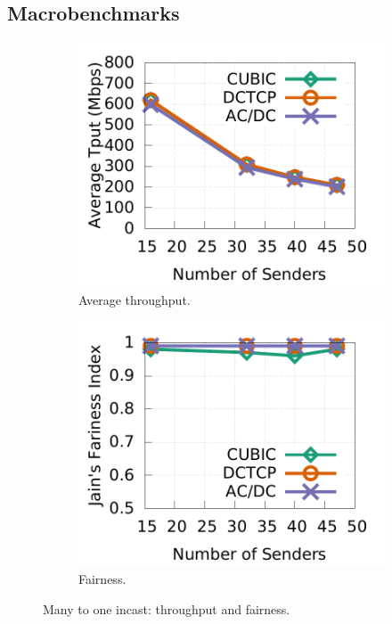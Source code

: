 \subsection{Macrobenchmarks}
\label{macro}

\begin{figure}[t]
        \centering
        \begin{subfigure}[b]{0.225\textwidth}
                \centering
                \includegraphics[width=\textwidth]{figures/incast/plots9k/incast_tput_vary_sender.pdf}
                \caption{Average throughput.}
                \label{incast_9k_tput}
        \end{subfigure}
        \begin{subfigure}[b]{0.225\textwidth}
                \centering
                \includegraphics[width=\textwidth]{figures/incast/plots9k/incast_fairness_vary_sender.pdf}
                \caption{Fairness.}
                \label{incast_9k_fariness}
        \end{subfigure}
        \caption{Many to one incast: throughput and fairness.}
        \label{incast_9k_tput_fairness}
\end{figure}

